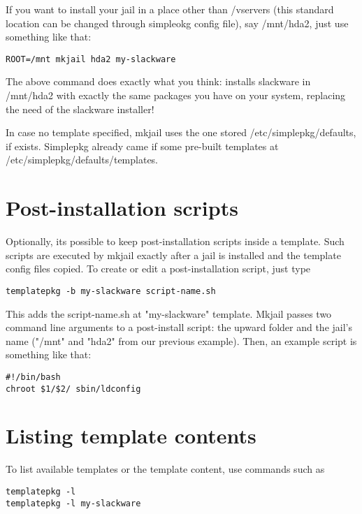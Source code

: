 \documentclass{article}
\begin{document}
If you want to install your jail in a place other than /vservers (this standard location can be changed through simpleokg config file), say /mnt/hda2, just use something like that:

\begin{verbatim}
ROOT=/mnt mkjail hda2 my-slackware
\end{verbatim}

The above command does exactly what you think: installs slackware in /mnt/hda2 with exactly the same packages you have on your system, replacing the need of the slackware installer!

In case no template specified, mkjail uses the one stored /etc/simplepkg/defaults, if exists. Simplepkg already came if some pre-built templates at /etc/simplepkg/defaults/templates.

\section{Post-installation scripts}

Optionally, its possible to keep post-installation scripts inside a template. Such scripts are executed by mkjail exactly after a jail is installed and the template config files copied. To create or edit a post-installation script, just type

\begin{verbatim}
templatepkg -b my-slackware script-name.sh
\end{verbatim}

This adds the script-name.sh at "my-slackware" template. Mkjail passes two command line arguments to a post-install script: the upward folder and the jail's name ("/mnt" and "hda2" from our previous example). Then, an example script is something like that:

\begin{verbatim}
#!/bin/bash
chroot $1/$2/ sbin/ldconfig
\end{verbatim}

\section{Listing template contents}

To list available templates or the template content, use commands such as 

\begin{verbatim}
templatepkg -l
templatepkg -l my-slackware
\end{verbatim}
\end{document}
